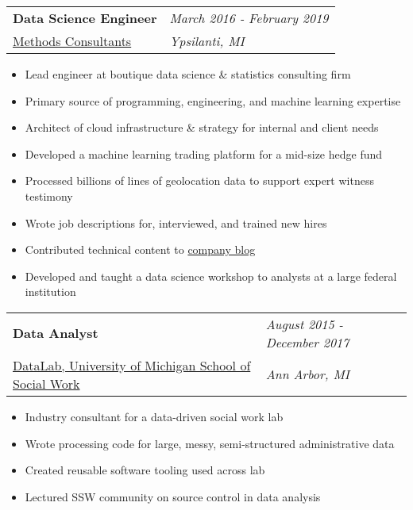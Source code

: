 \documentclass[margin,line]{res}
\begin{document}
\begin{resume}
\begin{tabular}{p{4.4in} l}
  {\bf Data Science Engineer} & \emph{March 2016 - February 2019}\\
  \href{https://www.methodsconsultants.com/}{Methods Consultants} & \emph{Ypsilanti, MI}
\end{tabular}
\vspace{2pt}
\begin{itemize}\itemsep -2pt
  \item Lead engineer at boutique data science \& statistics consulting firm
  \item Primary source of programming, engineering, and machine learning expertise
  \item Architect of cloud infrastructure \& strategy for internal and client needs
  \item Developed a machine learning trading platform for a mid-size hedge fund
  \item Processed billions of lines of geolocation data to support expert witness testimony
  \item Wrote job descriptions for, interviewed, and trained new hires
  \item Contributed technical content to \href{https://blog.methodsconsultants.com}{company blog}
  \item Developed and taught a data science workshop to analysts at a large federal institution
\end{itemize}

\begin{tabular}{p{4.4in} l}
  {\bf Data Analyst} & \emph{August 2015 - December 2017}\\
  \href{https://www.ssw-datalab.org/}{DataLab, University of Michigan School of Social Work} & \emph{Ann Arbor, MI}
\end{tabular}
\vspace{2pt}
\begin{itemize}\itemsep -2pt
  \item Industry consultant for a data-driven social work lab
  \item Wrote processing code for large, messy, semi-structured administrative data
  \item Created reusable software tooling used across lab
  \item Lectured SSW community on source control in data analysis
\end{itemize}


\end{resume}
\end{document}
